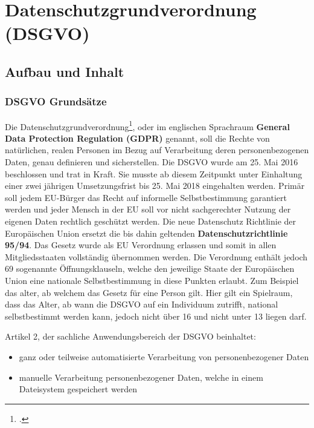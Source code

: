 \chapter{Datenschutzgrundverordnung (DSGVO)}
\putz

\section{Aufbau und Inhalt}
\subsection{DSGVO Grundsätze}
Die Datenschutzgrundverordnung\footcite{dsgvo-wiki}, oder im englischen Sprachraum \textbf{General Data Protection Regulation (GDPR)} genannt, soll die Rechte von natürlichen, realen Personen im Bezug auf Verarbeitung deren personenbezogenen Daten, genau definieren und sicherstellen. Die DSGVO wurde am 25. Mai 2016 beschlossen und trat in Kraft. Sie musste ab diesem Zeitpunkt unter Einhaltung einer zwei jährigen Umsetzungsfrist bis 25. Mai 2018 eingehalten werden. Primär soll jedem EU-Bürger das Recht auf informelle Selbstbestimmung garantiert werden und jeder Mensch in der EU soll vor nicht sachgerechter Nutzung der eigenen Daten rechtlich geschützt werden.
Die neue Datenschutz Richtlinie der Europäischen Union ersetzt die bis dahin geltenden \textbf{Datenschutzrichtlinie 95/94}. Das Gesetz wurde als EU Verordnung erlassen und somit in allen Mitgliedsstaaten vollständig übernommen werden. Die Verordnung enthält jedoch 69 sogenannte Öffnungsklauseln, welche den jeweilige Staate der Europäischen Union eine nationale Selbstbestimmung in diese Punkten erlaubt. Zum Beispiel das alter, ab welchem das Gesetz für eine Person gilt. Hier gilt ein Spielraum, dass das Alter, ab wann die DSGVO auf ein Individuum zutrifft, national selbstbestimmt werden kann, jedoch nicht über 16 und nicht unter 13 liegen darf.

Artikel 2, der sachliche Anwendungsbereich der DSGVO beinhaltet:
\begin{itemize}
	\item ganz oder teilweise automatisierte Verarbeitung von personenbezogener Daten
	\item manuelle Verarbeitung personenbezogener Daten, welche in einem Dateisystem gespeichert werden
\end{itemize}

